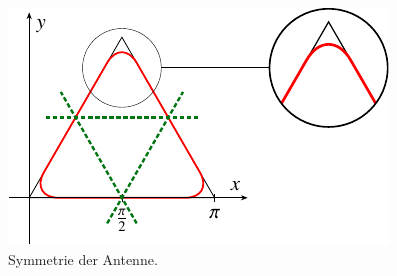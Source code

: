 \begin{figure}
	\centering
	\includegraphics{papers/antennen/images/SymmetrieDreieck.pdf}
	\caption{Symmetrie der Antenne.}
	\label{antennen:tikzAntenneSymmetrie}
\end{figure}